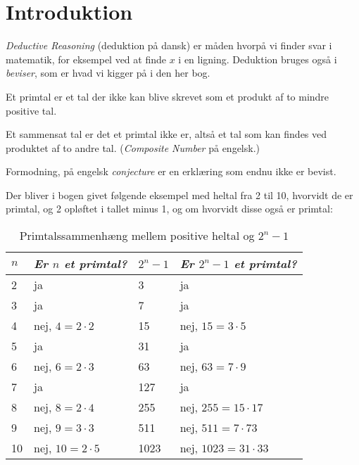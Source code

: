 \chapter{Introduktion}

\textit{Deductive Reasoning} (deduktion på dansk) er måden hvorpå vi finder svar i matematik, for eksempel ved at finde $x$ i en ligning. Deduktion bruges også i \textit{beviser}, som er hvad vi kigger på i den her bog.

\begin{definition}[Primtal]
  Et primtal er et tal der ikke kan blive skrevet som et produkt af to mindre positive tal.
\end{definition}

\begin{definition}
Et sammensat tal er det et primtal ikke er, altså et tal som kan findes ved produktet af to andre tal. (\textit{Composite Number} på engelsk.)
\end{definition}

\begin{definition}[Formodning]
Formodning, på engelsk \textit{conjecture} er en erklæring som endnu ikke er bevist.
\end{definition}

Der bliver i bogen givet følgende eksempel med heltal fra 2 til 10, hvorvidt de er primtal, og 2 opløftet i tallet minus 1, og om hvorvidt disse også er primtal:

\begin{table}[]
\centering
\begin{tabular}{llll}
\textit{$n$} & \textit{Er $n$ et primtal?} & \textit{$2^n-1$} & \textit{Er $2^n-1$ et primtal?} \\ \hline
2            & ja                          & 3                & ja                              \\
3            & ja                          & 7                & ja                              \\
4            & nej, $4 = 2 \cdot 2$        & 15               & nej, $15 = 3 \cdot 5$           \\
5            & ja                          & 31               & ja                              \\
6            & nej, $6 = 2 \cdot 3$        & 63               & nej, $63 = 7 \cdot 9$           \\
7            & ja                          & 127              & ja                              \\
8            & nej, $8 = 2 \cdot 4$        & 255              & nej, $255 = 15 \cdot 17$        \\
9            & nej, $9 = 3 \cdot 3$        & 511              & nej, $511 = 7 \cdot 73$         \\
10           & nej, $10 = 2 \cdot 5$       & 1023             & nej, $1023 = 31 \cdot 33$
\end{tabular}
  \caption{\label{fig:primtal2n} Primtalssammenhæng mellem positive heltal og $2^{n}-1$}
\end{table}

